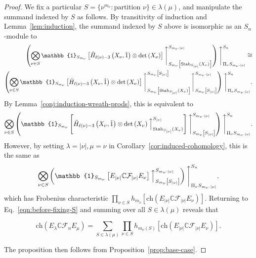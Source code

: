 \documentclass[ALCO, Unicode]{cedram}
\def\ch{\mathrm{ch}}
\def\C{{\mathbb{C}}}
\def\stab{\mathrm{Stab}}
\def\ch{\mathrm{ch}}
\begin{document}
\begin{proof}
We fix a particular $S = \{\nu^{m_\nu}:  \text{partition }\nu\} \in \lambda(\mu)$, and manipulate the summand indexed by $S$ as follows.  By transitivity of induction and Lemma~\ref{lem:induction}, the summand indexed by $S$ above is isomorphic as an $S_n$-module to
\begin{align*}
\left(\bigotimes_{\nu \in S}\mathbb{1}_{S_{m_\nu}}\left[ \Tilde{H}_{\ell(\nu) - 3} \left(X_\nu, \hat{1}\right) \otimes \det\left({X_{\nu}}\right)\right]\Bigg\uparrow_{S_{m_\nu}\left[\stab_{S_{|\nu|}}(X_\nu)\right]}^{S_{m_\nu\cdot|\nu|}}\right)\Bigg \uparrow_{\Pi_{\nu}S_{m_\nu \cdot |\nu|}}^{S_n} \cong \\
\left(\bigotimes_{\nu \in S}\mathbb{1}_{S_{m_\nu}}\left[ \Tilde{H}_{\ell(\nu) - 3} \left(X_\nu, \hat{1}\right) \otimes \det \left({X_{\nu}}\right)\right]\Bigg \uparrow_{S_{m_\nu}\left[\stab_{S_{|\nu|}}(X_\nu)\right]}^{S_{m_\nu}\left[S_{|\nu|}\right]} \Bigg \uparrow_{S_{m_\nu}\left[S_{|\nu|}\right]}^{S_{m_\nu \cdot |\nu|}}\right)\Bigg\uparrow_{\Pi_{\nu}S_{m_\nu \cdot|\nu|}}^{S_n}.\\
\end{align*}
By Lemma~\ref{conj:induction-wreath-prods}, this is equivalent to 
\begin{align*}
 \bigotimes_{\nu \in S}\left(\mathbb{1}_{S_{m_\nu}}\left[  \Tilde{H}_{\mathrm{\ell(\nu) - 3}} \left( X_\nu, \hat{1} \right) \otimes \det \left({X_{\nu}}\right)\Big \uparrow_{\stab_{S_{|\nu|}}(X_\nu)}^{S_{|\nu|}}\right] \Bigg \uparrow_{S_{m_\nu}\left[S_{|\nu|}\right]}^{S_{m_\nu \cdot |\nu|}}\right)\Bigg\uparrow_{\Pi_{\nu}S_{m_\nu \cdot |\nu|}}^{S_n}.
\end{align*}
However, by setting $\lambda = |\nu|, \mu=\nu$ in Corollary~\ref{cor:induced-cohomology}, this is the same as
\begin{align*}
 \bigotimes_{\nu \in S}\left(\mathbb{1}_{S_{m_\nu}}\left[ E_{|\nu|}\C \mathcal{F}_{|\nu|} E_\nu\right] \Big \uparrow_{S_{m_\nu}\left[S_{|\nu|}\right]}^{S_{m_\nu \cdot |\nu|}} \right)\Bigg \uparrow_{\Pi_{\nu}S_{m_\nu \cdot |\nu|}}^{S_n},
\end{align*}
which has Frobenius characteristic $ \prod_{\nu\in S}h_{m_\nu}\left[ \ch( E_{|\nu|} \C \mathcal{F}_{|\nu|}E_\nu)\right].$ Returning to Eq.~\eqref{eqn:before-fixing-S} and summing over all $S \in \lambda(\mu)$ reveals that

\[\ch(E_\lambda \C \mathcal{F}_n E_\mu) = \sum_{S \in \lambda(\mu)} \prod_{\nu\in S}h_{m_\nu(S)}\left[ \ch( E_{|\nu|} \C \mathcal{F}_{|\nu|}E_\nu)\right].\]


The proposition then follows from Proposition~\ref{prop:base-case}.
\end{proof}
\end{document}
